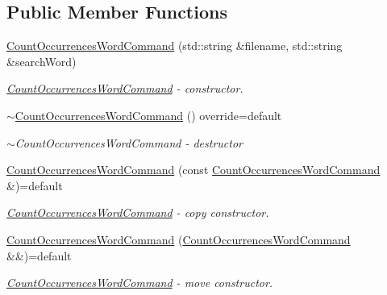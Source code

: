 \subsection*{Public Member Functions}
\begin{DoxyCompactItemize}
\item 
\hyperlink{classtwo__gis__test_1_1command__handler_1_1_count_occurrences_word_command_a08527c551b89b5dcaf41b05364bff426}{Count\+Occurrences\+Word\+Command} (std\+::string \&filename, std\+::string \&search\+Word)
\begin{DoxyCompactList}\small\item\em \hyperlink{classtwo__gis__test_1_1command__handler_1_1_count_occurrences_word_command}{Count\+Occurrences\+Word\+Command} -\/ constructor. \end{DoxyCompactList}\item 
\hyperlink{classtwo__gis__test_1_1command__handler_1_1_count_occurrences_word_command_a774bf6c5dc0ec6e458633e35cff74afa}{$\sim$\+Count\+Occurrences\+Word\+Command} () override=default
\begin{DoxyCompactList}\small\item\em $\sim$\+Count\+Occurrences\+Word\+Command -\/ destructor \end{DoxyCompactList}\item 
\hyperlink{classtwo__gis__test_1_1command__handler_1_1_count_occurrences_word_command_abf0daa24ed02f804727da6976559bf17}{Count\+Occurrences\+Word\+Command} (const \hyperlink{classtwo__gis__test_1_1command__handler_1_1_count_occurrences_word_command}{Count\+Occurrences\+Word\+Command} \&)=default
\begin{DoxyCompactList}\small\item\em \hyperlink{classtwo__gis__test_1_1command__handler_1_1_count_occurrences_word_command}{Count\+Occurrences\+Word\+Command} -\/ copy constructor. \end{DoxyCompactList}\item 
\hyperlink{classtwo__gis__test_1_1command__handler_1_1_count_occurrences_word_command_acc6f52581a2419d43ed669a947e137b3}{Count\+Occurrences\+Word\+Command} (\hyperlink{classtwo__gis__test_1_1command__handler_1_1_count_occurrences_word_command}{Count\+Occurrences\+Word\+Command} \&\&)=default
\begin{DoxyCompactList}\small\item\em \hyperlink{classtwo__gis__test_1_1command__handler_1_1_count_occurrences_word_command}{Count\+Occurrences\+Word\+Command} -\/ move constructor. \end{DoxyCompactList}\item 

\end{DoxyCompactItemize}
